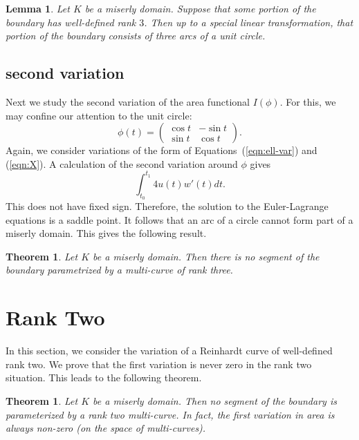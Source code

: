 \documentclass[11pt]{amsart}
\newtheorem{thm}[equation]{Theorem}
\newtheorem{lemma}[equation]{Lemma}
\begin{document}
\begin{lemma}  Let $K$ be a miserly domain.  Suppose that some portion of the boundary
has well-defined rank $3$.  Then up to a special linear transformation, that portion of the boundary
consists of three arcs of a unit circle.
\end{lemma}


\subsection{second variation}

Next we study the second variation of the area functional $I(\phi)$.  For this,
we may confine our attention to the unit circle:
$$
\phi(t) = \begin{pmatrix} \cos t & -\sin t \\ \sin t & \cos t
\end{pmatrix}.
$$
Again, we consider variations of the form of Equations~(\ref{eqn:ell-var}) and (\ref{eqn:X}).
A calculation of the second variation around $\phi$ gives
$$
\int_{t_0}^{t_1} 4 u(t) w'(t) dt.
$$
This does not have fixed sign.  Therefore, the solution to the Euler-Lagrange equations is a saddle point. 
It follows that an arc of a circle cannot form part of a miserly domain.  This gives
the following result.

\begin{thm}  Let $K$ be a miserly domain.  Then there is no segment
of the boundary parametrized by a multi-curve of  rank  three.
\end{thm}



\section{Rank Two}


In this section, we consider the variation of a Reinhardt curve of
well-defined rank two.  We prove that the first variation is never
zero in the rank two situation.  This leads to the following theorem.

\begin{thm} Let $K$ be a miserly domain.  Then no segment of the
  boundary is parameterized by a rank two multi-curve.  In fact, the
  first variation in area is always non-zero (on the space of
  multi-curves).
\end{thm}
\end{document}
